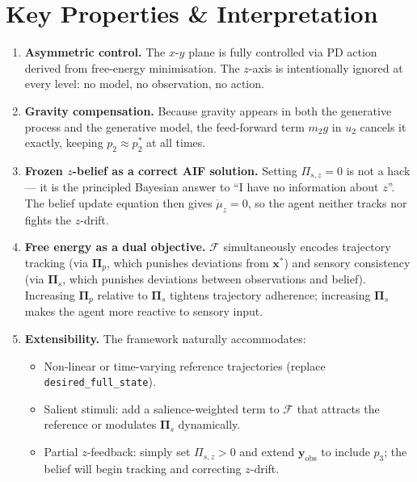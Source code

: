 \documentclass[11pt, a4paper]{article}
\newcommand{\vect}[1]{\bm{#1}}
\newcommand{\mat}[1]{\mathbf{#1}}
\newcommand{\FE}{\mathcal{F}}
\newcommand{\Pip}{\mat{\Pi}_p}
\newcommand{\Pis}{\mat{\Pi}_s}
\begin{document}
\section{Key Properties \& Interpretation}

\begin{enumerate}[leftmargin=*, label=\textbf{\arabic*.}]

\item \textbf{Asymmetric control.}
  The $x$-$y$ plane is fully controlled via PD action derived from free-energy
  minimisation. The $z$-axis is intentionally ignored at every level: no model,
  no observation, no action.

\item \textbf{Gravity compensation.}
  Because gravity appears in both the generative process and the generative
  model, the feed-forward term $m_2 g$ in $u_2$ cancels it exactly, keeping
  $p_2 \approx p_2^*$ at all times.

\item \textbf{Frozen $z$-belief as a correct AIF solution.}
  Setting $\Pi_{s,z}=0$ is not a hack --- it is the principled Bayesian answer
  to ``I have no information about $z$''. The belief update equation then gives
  $\dot{\mu}_z = 0$, so the agent neither tracks nor fights the $z$-drift.

\item \textbf{Free energy as a dual objective.}
  $\FE$ simultaneously encodes trajectory tracking (via $\Pip$, which punishes
  deviations from $\vect{x}^*$) and sensory consistency (via $\Pis$, which
  punishes deviations between observations and belief). Increasing $\Pip$
  relative to $\Pis$ tightens trajectory adherence; increasing $\Pis$ makes
  the agent more reactive to sensory input.

\item \textbf{Extensibility.}
  The framework naturally accommodates:
  \begin{itemize}[noitemsep]
    \item Non-linear or time-varying reference trajectories (replace
          \texttt{desired\_full\_state}).
    \item Salient stimuli: add a salience-weighted term to $\FE$ that attracts
          the reference or modulates $\Pis$ dynamically.
    \item Partial $z$-feedback: simply set $\Pi_{s,z}>0$ and extend
          $\vect{y}_{\text{obs}}$ to include $p_3$; the belief will begin
          tracking and correcting $z$-drift.
  \end{itemize}

\end{enumerate}
\end{document}
